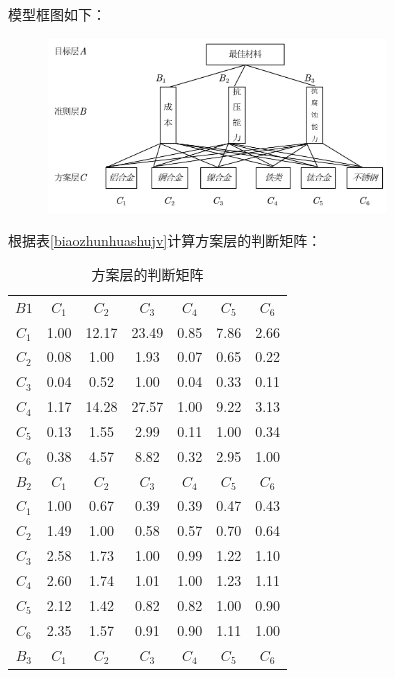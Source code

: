 \documentclass{article}
\begin{document}
  模型框图如下：
  	\begin{figure}[H]
  	\centering
  	\includegraphics[width=0.8\textwidth]{img/层次分析法图.png}
  	\label{fig:ccfxft}
  \end{figure}
  根据表\ref{biaozhunhuashujv}计算方案层的判断矩阵：
  \begin{table}[H]
  	\centering
  	\caption{方案层的判断矩阵}
  	\begin{tabular}{ccccccc}
  		\toprule[1.5pt]
  		$B1$    & $C_1$     & $C_2$     & $C_3$      & $C_4$      & $C_5$      & $C_6$  \\
  		$C_1$     & 1.00  & 12.17 & 23.49 & 0.85  & 7.86  & 2.66 \\
  		$C_2$     & 0.08  & 1.00  & 1.93  & 0.07  & 0.65  & 0.22 \\
  		$C_3$     & 0.04  & 0.52  & 1.00  & 0.04  & 0.33  & 0.11 \\
  		$C_4$     & 1.17  & 14.28 & 27.57 & 1.00  & 9.22  & 3.13 \\
  		$C_5$     & 0.13  & 1.55  & 2.99  & 0.11  & 1.00  & 0.34 \\
  		$C_6$     & 0.38  & 4.57  & 8.82  & 0.32  & 2.95  & 1.00 \\
  		\toprule[1.5pt]
  		$B_2$    & $C_1$     & $C_2$     & $C_3$      & $C_4$      & $C_5$      & $C_6$  \\
  		$C_1$     & 1.00  & 0.67  & 0.39  & 0.39  & 0.47  & 0.43 \\
  		$C_2$     & 1.49  & 1.00  & 0.58  & 0.57  & 0.70  & 0.64 \\
  		$C_3$     & 2.58  & 1.73  & 1.00  & 0.99  & 1.22  & 1.10 \\
  		$C_4$     & 2.60  & 1.74  & 1.01  & 1.00  & 1.23  & 1.11 \\
  		$C_5$     & 2.12  & 1.42  & 0.82  & 0.82  & 1.00  & 0.90 \\
  		$C_6$     & 2.35  & 1.57  & 0.91  & 0.90  & 1.11  & 1.00 \\
  		\toprule[1.5pt]
  		$B_3$    & $C_1$     & $C_2$     & $C_3$      & $C_4$      & $C_5$      & $C_6$  \\

\end{tabular}
\end{table}
\end{document}
